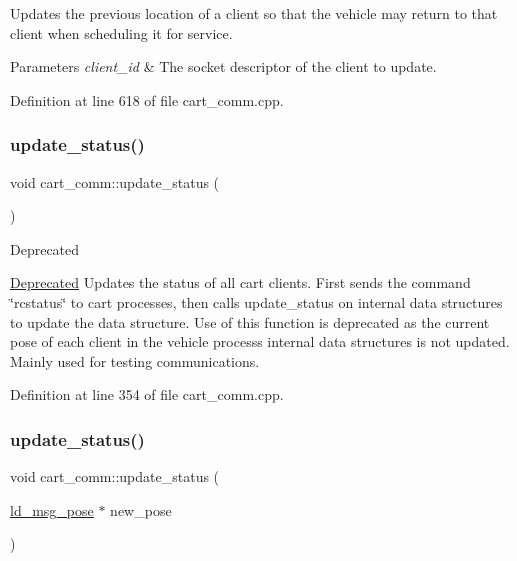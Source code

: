Updates the previous location of a client so that the vehicle may return to that client when scheduling it for service. 
\begin{DoxyParams}{Parameters}
{\em client\+\_\+id} & The socket descriptor of the client to update. \\
\hline
\end{DoxyParams}


Definition at line 618 of file cart\+\_\+comm.\+cpp.

\mbox{\label{classcart__comm_ac3827fcfb77461137bf7a061471c7feb}} 
\subsubsection{\texorpdfstring{update\+\_\+status()}{update\_status()}\hspace{0.1cm}{\footnotesize\ttfamily [1/2]}}
{\footnotesize\ttfamily void cart\+\_\+comm\+::update\+\_\+status (\begin{DoxyParamCaption}{ }\end{DoxyParamCaption})}

\begin{DoxyRefDesc}{Deprecated}
\item[\mbox{\hyperlink{deprecated__deprecated000001}{Deprecated}}]Updates the status of all cart clients. First sends the command \char`\"{}rcstatus\char`\"{} to cart processes, then calls update\+\_\+status on internal data structures to update the data structure. Use of this function is deprecated as the current pose of each client in the vehicle process\textquotesingle{}s internal data structures is not updated. Mainly used for testing communications. \end{DoxyRefDesc}


Definition at line 354 of file cart\+\_\+comm.\+cpp.

\mbox{\label{classcart__comm_a6724898e4c76e4e802c4bc6b814130bc}} 
\subsubsection{\texorpdfstring{update\+\_\+status()}{update\_status()}\hspace{0.1cm}{\footnotesize\ttfamily [2/2]}}
{\footnotesize\ttfamily void cart\+\_\+comm\+::update\+\_\+status (\begin{DoxyParamCaption}\item[{\mbox{\hyperlink{structld__msg__pose}{ld\+\_\+msg\+\_\+pose}} $\ast$}]{new\+\_\+pose }\end{DoxyParamCaption})}

